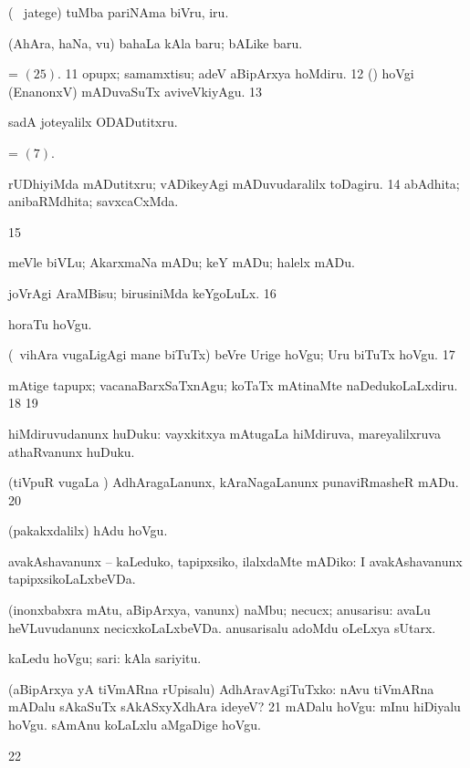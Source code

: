 {{ (\sA\  jatege) tuMba pariNAma biVru, iru. 

 (AhAra, haNa, \mo vu)
bahaLa kAla baru; bALike baru. 

 = \hyperlink{go pagu25}{\pagu $(25)$}. 
\num{11}  opupx; samamxtisu; adeV aBipArxya hoMdiru. 
\num{12}  (\kanmu) hoVgi (EnanonxV) mADuvaSuTx aviveVkiyAgu. 
\hypertarget{go pagu13}{}
\num{13}  

 sadA joteyalilx ODADutitxru. 

 = \hyperlink{go pagu7}{\pagu $(7)$}.

 rUDhiyiMda mADutitxru; vADikeyAgi mADuvudaralilx toDagiru. 
\num{14}  abAdhita; anibaRMdhita; savxcaCxMda. 

\num{15} 

 meVle biVLu; AkarxmaNa mADu; keY mADu; halelx mADu. 

 joVrAgi AraMBisu; birusiniMda keYgoLuLx. 
\num{16}  

 horaTu hoVgu.

 (\kanmu\ vihAra \mo vugaLigAgi mane biTuTx) beVre Urige hoVgu; Uru biTuTx hoVgu. 
\num{17}  

 mAtige tapupx; vacanaBarxSaTxnAgu; koTaTx
mAtinaMte naDedukoLaLxdiru. 
\num{18}  
\num{19}  

 hiMdiruvudanunx huDuku:  vayxkitxya mAtugaLa hiMdiruva, mareyalilxruva athaRvanunx huDuku. 

 (tiVpuR \mo vugaLa \vi) AdhAragaLanunx, kAraNagaLanunx punaviRmasheR
mADu. 
\num{20}  

 (pakakxdalilx) hAdu hoVgu. 

 avakAshavanunx -- kaLeduko, tapipxsiko, ilalxdaMte mADiko:
I avakAshavanunx tapipxsikoLaLxbeVDa. 

 (inonxbabxra mAtu, aBipArxya,
\mo vanunx) naMbu; necucx; anusarisu:  avaLu
heVLuvudanunx necicxkoLaLxbeVDa.  anusarisalu
adoMdu oLeLxya sUtarx. 

 kaLedu hoVgu; sari:  kAla
sariyitu. 

 (aBipArxya yA tiVmARna rUpisalu) AdhAravAgiTuTxko:  nAvu tiVmARna mADalu sAkaSuTx sAkASxyXdhAra ideyeV?
\num{21}  mADalu hoVgu:  mInu hiDiyalu hoVgu.
 sAmAnu koLaLxlu aMgaDige hoVgu. 
\num{22} 

}}
